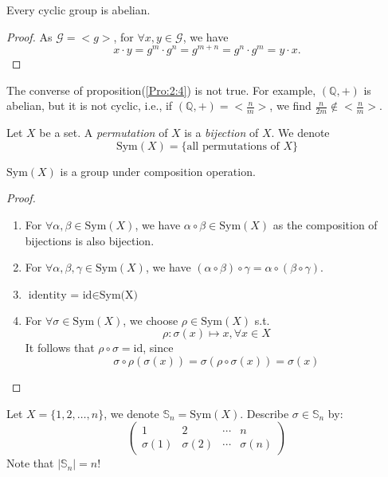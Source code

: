 \begin{proposition}\label{Pro:2:4}
Every cyclic group is abelian.
\end{proposition}
\begin{proof}
As $\mathcal{G} = <g>$, for $\forall x,y\in\mathcal{G}$, we have
\[
x\cdot y = g^m\cdot g^n = g^{m+n}=g^n\cdot g^m=y\cdot x.
\]
\end{proof}
\begin{remark}
The converse of proposition(\ref{Pro:2:4}) is not true. For example, $(\mathbb{Q},+)$ is abelian, but it is not cyclic, i.e., if $(\mathbb{Q},+)=<\frac{n}{m}>$, we find $\frac{n}{2m}\notin <\frac{n}{m}>$.
\end{remark}
\begin{definition}
Let $X$ be a set. A \emph{permutation} of $X$ is a \emph{bijection} of $X$. We denote 
\[
\mbox{Sym}(X) = \{\mbox{all permutations of }X\}
\]
\end{definition}
\begin{proposition}
$\mbox{Sym}(X)$ is a group under composition operation.
\end{proposition}
\begin{proof}
\begin{enumerate}
\item
For $\forall \alpha,\beta\in\mbox{Sym}(X)$, we have $\alpha\circ\beta\in\mbox{Sym}(X)$ as the composition of bijections is also bijection.
\item
For $\forall \alpha,\beta,\gamma\in\mbox{Sym}(X)$, we have $(\alpha\circ\beta)\circ\gamma = \alpha\circ(\beta\circ\gamma)$.
\item
$\mbox{identity = id$\in$Sym(X)}$
\item
For $\forall\sigma\in\mbox{Sym}(X)$, we choose $\rho\in\mbox{Sym}(X)$ s.t.
\[
\rho: \sigma(x)\mapsto x,\forall x\in X
\]
It follows that $\rho\circ\sigma=\mbox{id}$, since
\[
\sigma\circ\rho(\sigma(x)) = \sigma(\rho\circ\sigma(x))=\sigma(x)
\]
\end{enumerate}
\end{proof}
Let $X=\{1,2,\dots,n\}$, we denote $\mathbb{S}_n = \mbox{Sym}(X)$. Describe $\sigma\in\mathbb{S}_n$ by:
\[
\begin{pmatrix}
1&2&\cdots&n\\
\sigma(1)&\sigma(2)&\cdots&\sigma(n)
\end{pmatrix}
\]
Note that $|\mathbb{S}_n|=n!$
